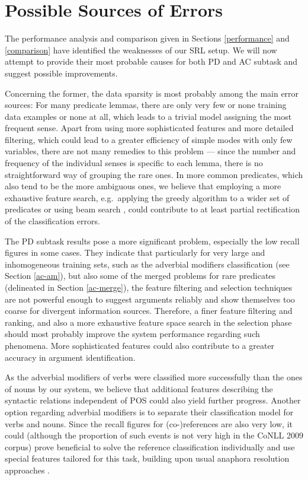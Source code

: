 \documentclass[12pt,notitlepage,a4paper]{report}
\begin{document}
\section{Possible Sources of Errors}\label{error-sources}

The performance analysis and comparison given in Sections \ref{performance} and \ref{comparison} have identified the weaknesses of our SRL setup. We will now attempt to provide their most probable causes for both PD and AC subtask and suggest possible improvements.

Concerning the former, the data sparsity is most probably among the main error sources: For many predicate lemmas, there are only very few or none training data examples or none at all, which leads to a trivial model assigning the most frequent sense. Apart from using more sophisticated features and more detailed filtering, which could lead to a greater efficiency of simple modes with only few variables, there are not many remedies to this problem --- since the number and frequency of the individual senses is specific to each lemma, there is no straightforward way of grouping the rare ones. In more common predicates, which also tend to be the more ambiguous ones, we believe that employing a more exhaustive feature search, e.g.\ applying the greedy algorithm to a wider set of predicates or using beam search \citep{aha95}, could contribute to at least partial rectification of the classification errors.

The PD subtask results pose a more significant problem, especially the low recall figures in some cases. They indicate that particularly for very large and inhomogeneous training sets, such as the adverbial modifiers classification (see Section \ref{ac-am}), but also some of the merged problems for rare predicates (delineated in Section \ref{ac-merge}), the feature filtering and selection techniques are not powerful enough to suggest arguments reliably and show themselves too coarse for divergent information sources. Therefore, a finer feature filtering and ranking, and also a more exhaustive feature space search in the selection phase should most probably improve the system performance regarding such phenomena. More sophisticated features could also contribute to a greater accuracy in argument identification.

As the adverbial modifiers of verbs were classified more successfully than the ones of nouns by our system, we believe that additional features describing the syntactic relations independent of POS could also yield further progress. Another option regarding adverbial modifiers is to separate their classification model for verbs and nouns. Since the recall figures for (co-)references are also very low, it could (although the proportion of such events is not very high in the CoNLL 2009 corpus) prove beneficial to solve the reference classification individually and use special features tailored for this task, building upon usual anaphora resolution approaches \citep{soon01,ng02}.
\end{document}
